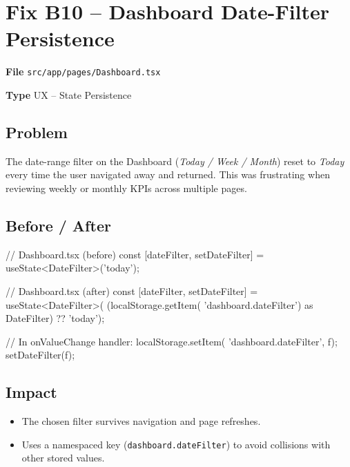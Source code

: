 \documentclass[12pt,a4paper]{report}
\newcommand{\diffL}{\noindent\begin{minipage}[t]{0.485\linewidth}}
\newcommand{\diffR}{\end{minipage}\hfill\begin{minipage}[t]{0.485\linewidth}}
\newcommand{\diffend}{\end{minipage}\par\smallskip}
\newcommand{\inforow}[2]{%
	\noindent
	\begin{tcolorbox}[
		colback   = lightblue,
		colframe  = midblue,
		arc       = 2pt,
		left      = 6pt, right = 6pt, top = 2pt, bottom = 2pt,
		sidebyside, sidebyside align = top seam,
		lefthand width = 3.2cm,
		segmentation hidden,
		]
		\textbf{\color{brandblue}\small #1}
		\tcblower
		{\small\color{labelgray} #2}
	\end{tcolorbox}\vspace{2pt}%
}
\newcommand{\file}[1]{\texttt{\small #1}}
\begin{document}
	\section{Fix B10 -- Dashboard Date-Filter Persistence}

	\inforow{File}{\file{src/app/pages/Dashboard.tsx}}
	\inforow{Type}{UX -- State Persistence}

	\subsection*{Problem}

	The date-range filter on the Dashboard (\emph{Today / Week / Month})
	reset to \emph{Today} every time the user navigated away and returned.
	This was frustrating when reviewing weekly or monthly KPIs across
	multiple pages.

	\subsection*{Before / After}

	\diffL
	\begin{beforecode}
// Dashboard.tsx (before)
const [dateFilter, setDateFilter] =
  useState<DateFilter>('today');
	\end{beforecode}
	\diffR
	\begin{aftercode}
// Dashboard.tsx (after)
const [dateFilter, setDateFilter] =
  useState<DateFilter>(
    (localStorage.getItem(
      'dashboard.dateFilter')
      as DateFilter) ?? 'today');

// In onValueChange handler:
localStorage.setItem(
  'dashboard.dateFilter', f);
setDateFilter(f);
	\end{aftercode}
	\diffend

	\subsection*{Impact}
	\begin{itemize}
		\item The chosen filter survives navigation and page refreshes.
		\item Uses a namespaced key (\texttt{dashboard.dateFilter}) to avoid collisions with other stored values.
	\end{itemize}

\end{document}
